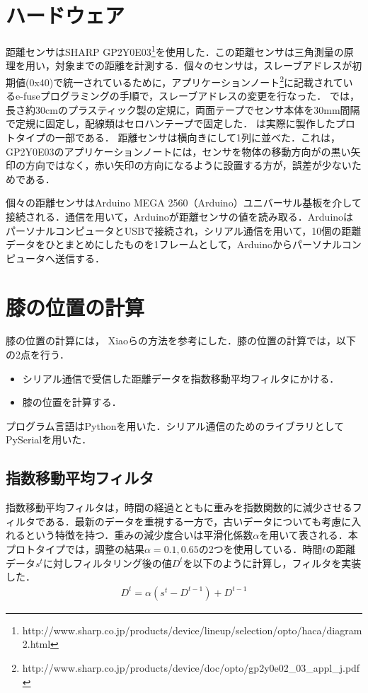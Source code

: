 \section{ハードウェア}
距離センサはSHARP GP2Y0E03\footnote{http://www.sharp.co.jp/products/device/lineup/selection/opto/haca/diagram2.html}を使用した．この距離センサは三角測量の原理を用い，対象までの距離を計測する．個々のセンサは，スレーブアドレスが初期値(0x40)で統一されているために，アプリケーションノート\footnote{http://www.sharp.co.jp/products/device/doc/opto/gp2y0e02\_03\_appl\_j.pdf}に記載されているe-fuseプログラミングの手順で，スレーブアドレスの変更を行なった．
\SysName では，長さ約30\si{cm}のプラスティック製の定規に，両面テープでセンサ本体を30\si{mm}間隔で定規に固定し，配線類はセロハンテープで固定した．
は実際に製作したプロトタイプの一部である．
距離センサは横向きにして1列に並べた．これは，GP2Y0E03のアプリケーションノート\footnotemark[2]には，センサを物体の移動方向がの黒い矢印の方向ではなく，赤い矢印の方向になるように設置する方が，誤差が少ないためである．
\par
個々の距離センサはArduino MEGA 2560（Arduino）ユニバーサル基板を介して接続される．\iic 通信を用いて，Arduinoが距離センサの値を読み取る．ArduinoはパーソナルコンピュータとUSBで接続され，シリアル通信を用いて，10個の距離データをひとまとめにしたものを1フレームとして，Arduinoからパーソナルコンピュータへ送信する．
\section{膝の位置の計算} 
膝の位置の計算には，
Xiaoら\cite{Xiao:2018:LOP:3173574.3173669}の方法を参考にした．膝の位置の計算では，以下の2点を行う．
\begin{itemize}
	\item シリアル通信で受信した距離データを指数移動平均フィルタにかける．
	\item 膝の位置を計算する．
\end{itemize}
プログラム言語はPythonを用いた．シリアル通信のためのライブラリとしてPySerialを用いた．
\subsection{指数移動平均フィルタ}
指数移動平均フィルタは，時間の経過とともに重みを指数関数的に減少させるフィルタである．最新のデータを重視する一方で，古いデータについても考慮に入れるという特徴を持つ．重みの減少度合いは平滑化係数$\alpha$を用いて表される．本プロトタイプでは，調整の結果$\alpha = 0.1, 0.65$の2つを使用している．時間$t$の距離データ$s^t$に対しフィルタリング後の値$D^t$を以下のように計算し，フィルタを実装した．
\begin{eqnarray}
	D^t = \alpha (s^t - D^{t-1}) + D^{t-1}
\end{eqnarray}

